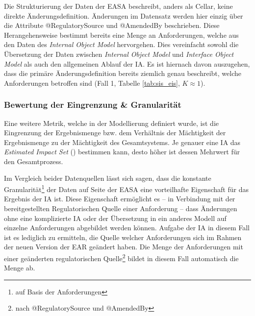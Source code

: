 \medskip
Die Strukturierung der Daten der \ac{EASA} beschreibt, anders als Cellar, keine direkte Änderungsdefinition.
Änderungen im Datensatz werden hier einzig über die Attribute @RegulatorySource und @AmendedBy beschrieben.
Diese Herangehensweise bestimmt bereits eine Menge an Anforderungen, welche aus den Daten des \textit{Internal Object Model} hervorgehen.
Dies vereinfacht sowohl die Übersetzung der Daten zwischen \textit{Internal Object Model} und \textit{Interface Object Model} als auch den allgemeinen Ablauf der \ac{IA}.
Es ist hiernach davon auszugehen, dass die primäre Änderungsdefinition bereits ziemlich genau beschreibt, welche Anforderungen betroffen sind (Fall 1, Tabelle \ref{tab:sis_eis}, $K \approx  1$).

\subsubsection{Bewertung der Eingrenzung \& Granularität}

Eine weitere Metrik, welche in der Modellierung definiert wurde, ist die Eingrenzung der Ergebnismenge bzw. dem Verhältnis der Mächtigkeit der Ergebnismenge zu der Mächtigkeit des Gesamtsystems.
Je genauer eine \ac{IA} das \textit{Estimated Impact Set} () bestimmen kann, desto höher ist dessen Mehrwert für den Gesamtprozess.

\medskip
Im Vergleich beider Datenquellen lässt sich sagen, dass die konstante Granularität\footnote{auf Basis der Anforderungen} der Daten auf Seite der \ac{EASA} eine vorteilhafte Eigenschaft für das Ergebnis der \ac{IA} ist.
Diese Eigenschaft ermöglicht es -- in Verbindung mit der bereitgestellten Regulatorischen Quelle einer Anforderung -- dass Änderungen ohne eine komplizierte \ac{IA} oder der Übersetzung in ein anderes Modell auf einzelne Anforderungen abgebildet werden können.
Aufgabe der \ac{IA} in diesem Fall ist es lediglich zu ermitteln, die Quelle welcher Anforderungen sich im Rahmen der neuen Version der \ac{EAR} geändert haben.
Die Menge der Anforderungen mit einer geänderten regulatorischen Quelle\footnote{nach @RegulatorySource und @AmendedBy} bildet in diesem Fall automatisch die Menge  ab.

